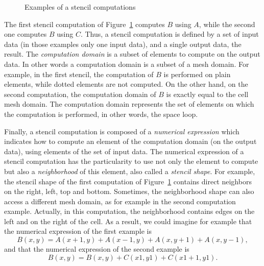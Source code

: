 \begin{figure}[!h]\begin{center}
  \caption{Examples of a stencil computations}
  \label{fig:ex}
\end{center}\end{figure}

The first stencil computation of Figure~\ref{fig:ex} computes $B$ using $A$, while the second one computes $B$ using $C$. Thus, a stencil computation is defined by a set of input data (in those examples only one input data), and a single output data, the result. The \emph{computation domain} is a subset of elements to compute on the output data. In other words a computation domain is a subset of a mesh domain. For example, in the first stencil, the computation of $B$ is performed on plain elements, while dotted elements are not computed. On the other hand, on the second computation, the computation domain of $B$ is exactly equal to the cell mesh domain. The computation domain represents the set of elements on which the computation is performed, in other words, the space loop.

Finally, a stencil computation is composed of a \emph{numerical expression} which indicates how to compute an element of the computation domain (on the output data), using elements of the set of input data. The numerical expression of a stencil computation has the particularity to use not only the element to compute but also a \emph{neighborhood} of this element, also called a \emph{stencil shape}. For example, the stencil shape of the first computation of Figure~\ref{fig:ex} contains direct neighbors on the right, left, top and bottom. Sometimes, the neighborhood shape can also access a different mesh domain, as for example in the second computation example. Actually, in this computation, the neighborhood contains edges on the left and on the right of the cell. As a result, we could imagine for example that the numerical expression of the first example is
\begin{equation*} 
B(x,y) = A(x+1,y)+A(x-1,y)+A(x,y+1)+A(x,y-1),
\end{equation*}
and that the numerical expression of the second example is
\begin{equation*} 
B(x,y) = B(x,y)+C(x1,y1)+C(x1+1,y1).
\end{equation*}

